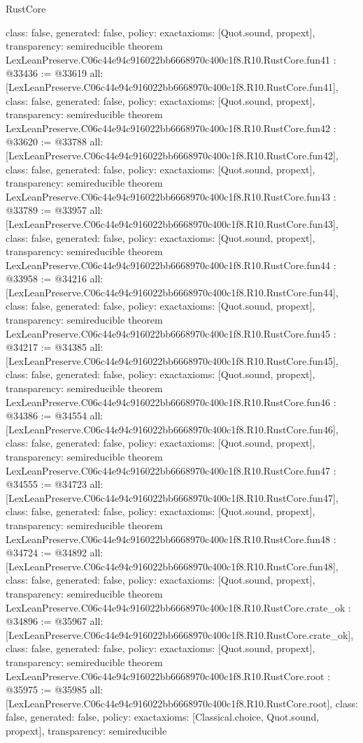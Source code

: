 \begin{lexlean}{RustCore}
\begin{coremodule}
{  class: false,
  generated: false,
  policy: exact{axioms: [Quot.sound, propext]},
  transparency: semireducible
}
theorem LexLeanPreserve.C06c44e94c916022bb6668970c400c1f8.R10.RustCore.fun41 : @33436 := @33619 {
  all: [LexLeanPreserve.C06c44e94c916022bb6668970c400c1f8.R10.RustCore.fun41],
  class: false,
  generated: false,
  policy: exact{axioms: [Quot.sound, propext]},
  transparency: semireducible
}
theorem LexLeanPreserve.C06c44e94c916022bb6668970c400c1f8.R10.RustCore.fun42 : @33620 := @33788 {
  all: [LexLeanPreserve.C06c44e94c916022bb6668970c400c1f8.R10.RustCore.fun42],
  class: false,
  generated: false,
  policy: exact{axioms: [Quot.sound, propext]},
  transparency: semireducible
}
theorem LexLeanPreserve.C06c44e94c916022bb6668970c400c1f8.R10.RustCore.fun43 : @33789 := @33957 {
  all: [LexLeanPreserve.C06c44e94c916022bb6668970c400c1f8.R10.RustCore.fun43],
  class: false,
  generated: false,
  policy: exact{axioms: [Quot.sound, propext]},
  transparency: semireducible
}
theorem LexLeanPreserve.C06c44e94c916022bb6668970c400c1f8.R10.RustCore.fun44 : @33958 := @34216 {
  all: [LexLeanPreserve.C06c44e94c916022bb6668970c400c1f8.R10.RustCore.fun44],
  class: false,
  generated: false,
  policy: exact{axioms: [Quot.sound, propext]},
  transparency: semireducible
}
theorem LexLeanPreserve.C06c44e94c916022bb6668970c400c1f8.R10.RustCore.fun45 : @34217 := @34385 {
  all: [LexLeanPreserve.C06c44e94c916022bb6668970c400c1f8.R10.RustCore.fun45],
  class: false,
  generated: false,
  policy: exact{axioms: [Quot.sound, propext]},
  transparency: semireducible
}
theorem LexLeanPreserve.C06c44e94c916022bb6668970c400c1f8.R10.RustCore.fun46 : @34386 := @34554 {
  all: [LexLeanPreserve.C06c44e94c916022bb6668970c400c1f8.R10.RustCore.fun46],
  class: false,
  generated: false,
  policy: exact{axioms: [Quot.sound, propext]},
  transparency: semireducible
}
theorem LexLeanPreserve.C06c44e94c916022bb6668970c400c1f8.R10.RustCore.fun47 : @34555 := @34723 {
  all: [LexLeanPreserve.C06c44e94c916022bb6668970c400c1f8.R10.RustCore.fun47],
  class: false,
  generated: false,
  policy: exact{axioms: [Quot.sound, propext]},
  transparency: semireducible
}
theorem LexLeanPreserve.C06c44e94c916022bb6668970c400c1f8.R10.RustCore.fun48 : @34724 := @34892 {
  all: [LexLeanPreserve.C06c44e94c916022bb6668970c400c1f8.R10.RustCore.fun48],
  class: false,
  generated: false,
  policy: exact{axioms: [Quot.sound, propext]},
  transparency: semireducible
}
theorem LexLeanPreserve.C06c44e94c916022bb6668970c400c1f8.R10.RustCore.crate_ok : @34896 := @35967 {
  all: [LexLeanPreserve.C06c44e94c916022bb6668970c400c1f8.R10.RustCore.crate_ok],
  class: false,
  generated: false,
  policy: exact{axioms: [Quot.sound, propext]},
  transparency: semireducible
}
theorem LexLeanPreserve.C06c44e94c916022bb6668970c400c1f8.R10.RustCore.root : @35975 := @35985 {
  all: [LexLeanPreserve.C06c44e94c916022bb6668970c400c1f8.R10.RustCore.root],
  class: false,
  generated: false,
  policy: exact{axioms: [Classical.choice, Quot.sound, propext]},
  transparency: semireducible
}


\end{coremodule}
\end{lexlean}
